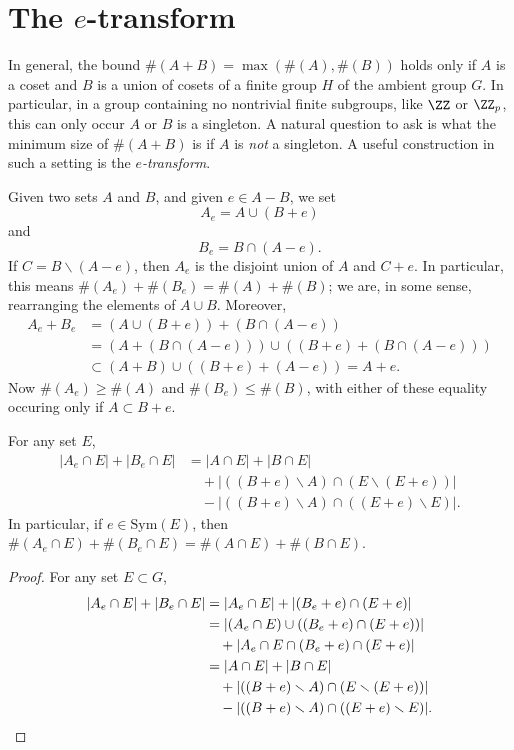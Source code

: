 \section{The $e$-transform}

In general, the bound $\#(A + B) = \max(\#(A),\#(B))$ holds only if $A$ is a coset and $B$ is a union of cosets of a finite group $H$ of the ambient group $G$. In particular, in a group containing no nontrivial finite subgroups, like $\ZZ$ or $\ZZ_p$, this can only occur $A$ or $B$ is a singleton. A natural question to ask is what the minimum size of $\#(A + B)$ is if $A$ is \emph{not} a singleton. A useful construction in such a setting is the \emph{$e$-transform}.

Given two sets $A$ and $B$, and given $e \in A - B$, we set
%
\[ A_e = A \cup (B + e) \]
%
and
%
\[ B_e = B \cap (A - e). \]
%
If $C = B \smallsetminus (A - e)$, then $A_e$ is the disjoint union of $A$ and $C + e$. In particular, this means $\#(A_e) + \#(B_e) = \#(A) + \#(B)$; we are, in some sense, rearranging the elements of $A \cup B$. Moreover,
%
\begin{align*}
    A_e + B_e &= (A \cup (B + e)) + (B \cap (A - e))\\
    &= (A + (B \cap (A - e))) \cup ((B + e) + (B \cap (A - e)))\\
    &\subset (A + B) \cup ((B + e) + (A - e)) = A + e.
\end{align*}
%
Now $\#(A_e) \geq \#(A)$ and $\#(B_e) \leq \#(B)$, with either of these equality occuring only if $A \subset B + e$. 

\begin{lemma}
    For any set $E$,
    \begin{align*}
        |A_e \cap E| + |B_e \cap E| &= |A \cap E| + |B \cap E|\\
        &\quad + |((B + e) \smallsetminus A) \cap (E \smallsetminus (E + e))|\\
        &\quad - |((B + e) \smallsetminus A) \cap ((E + e) \smallsetminus E)|.
    \end{align*}
    In particular, if $e \in \text{Sym}(E)$, then $\#(A_e \cap E) + \#(B_e \cap E) = \#(A \cap E) + \#(B \cap E)$.
\end{lemma}
\begin{proof}
    For any set $E \subset G$,
    \begin{align*}
        |A_e \cap E| + |B_e \cap E| &= |A_e \cap E| + |(B_e + e) \cap (E + e)|\\
        &= |(A_e \cap E) \cup ((B_e + e) \cap (E + e))|\\
        &\quad + |A_e \cap E \cap (B_e + e) \cap (E + e)|\\
        &= |A \cap E| + |B \cap E|\\
        &\quad + |((B + e) \smallsetminus A) \cap (E \smallsetminus (E + e))|\\
        &\quad - |((B + e) \smallsetminus A) \cap ((E + e) \smallsetminus E)|. \qedhere
    \end{align*}
\end{proof}

